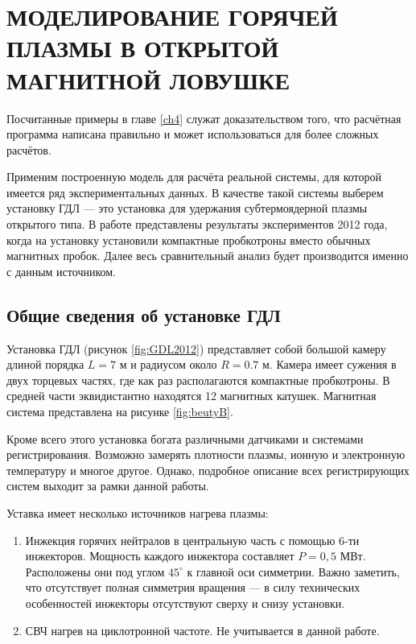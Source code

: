 \chapter{МОДЕЛИРОВАНИЕ ГОРЯЧЕЙ ПЛАЗМЫ В ОТКРЫТОЙ МАГНИТНОЙ ЛОВУШКЕ}


Посчитанные примеры в главе \ref{ch4} служат доказательством того, что расчётная программа написана правильно и может использоваться для более сложных расчётов.

Применим построенную модель для расчёта реальной системы, для которой имеется ряд экспериментальных данных. В качестве такой системы выберем установку ГДЛ --- это установка для удержания субтермоядерной плазмы открытого типа. В работе \cite{anikeev2012} представлены результаты экспериментов 2012 года, когда на установку установили компактные пробкотроны вместо обычных магнитных пробок. Далее весь сравнительный анализ будет производится именно с данным источником.

\section{Общие сведения об установке ГДЛ}

Установка ГДЛ (рисунок \ref{fig:GDL2012}) представляет собой большой камеру длиной порядка $L = 7 \text{ м}$ и радиусом около $R = 0.7 \text{ м}$. Камера имеет сужения в двух торцевых частях, где как раз располагаются компактные пробкотроны. В средней части эквидистантно находятся 12 магнитных катушек. Магнитная система представлена на рисунке \ref{fig:beutyB}.  

Кроме всего этого установка богата различными датчиками и системами регистрирования. Возможно замерять плотности плазмы, ионную и электронную температуру и многое другое. Однако, подробное описание всех регистрирующих систем выходит за рамки данной работы.

Уставка имеет несколько источников нагрева плазмы:
\begin{enumerate}
	\item Инжекция горячих нейтралов в центральную часть с помощью 6-ти инжекторов. Мощность каждого инжектора составляет $P = 0,5 \text{ МВт}$. Расположены они под углом $45^{\circ}$ к главной оси симметрии. Важно заметить, что отсутствует полная симметрия вращения --- в силу технических особенностей инжекторы отсутствуют сверху и снизу установки.
	\item СВЧ нагрев на циклотронной частоте. Не учитывается в данной работе.
\end{enumerate}

